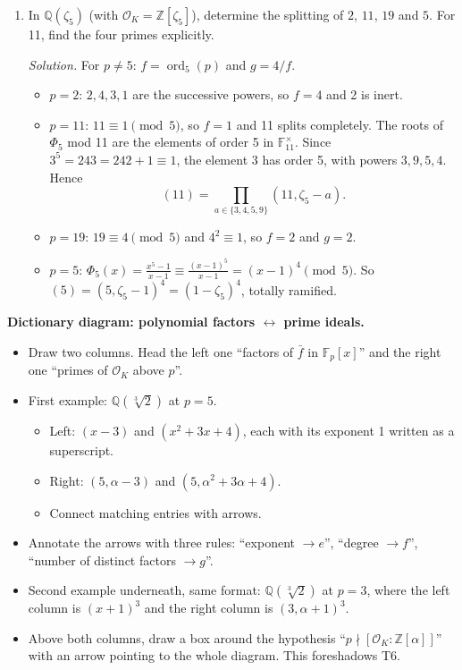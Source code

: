 \documentclass[11pt]{article}
\newcommand{\Z}{\mathbb{Z}}
\newcommand{\Q}{\mathbb{Q}}
\newcommand{\F}{\mathbb{F}}
\newcommand{\OK}{\mathcal{O}_K}
\DeclareMathOperator{\ord}{ord}
\begin{document}
\begin{enumerate}[label=\textbf{Q5.\arabic*}]
  \item In $\Q(\zeta_5)$ (with $\OK=\Z[\zeta_5]$), determine the splitting of $2$, $11$, $19$ and $5$. For 11, find the four primes explicitly.

  \textit{Solution.} For $p\ne5$: $f=\ord_5(p)$ and $g=4/f$.
  \begin{itemize}
    \item $p=2$: $2,4,3,1$ are the successive powers, so $f=4$ and 2 is inert.
    \item $p=11$: $11\equiv1\pmod 5$, so $f=1$ and 11 splits completely. The roots of $\Phi_5$ mod 11 are the elements of order 5 in $\F_{11}^\times$. Since $3^5=243=242+1\equiv1$, the element 3 has order 5, with powers $3,9,5,4$. Hence
    \[
    (11)=\prod_{a\in\{3,4,5,9\}}(11,\zeta_5-a).
    \]
    \item $p=19$: $19\equiv4\pmod 5$ and $4^2\equiv1$, so $f=2$ and $g=2$.
    \item $p=5$: $\Phi_5(x)=\frac{x^5-1}{x-1}\equiv\frac{(x-1)^5}{x-1}=(x-1)^4\pmod5$. So $(5)=(5,\zeta_5-1)^4=(1-\zeta_5)^4$, totally ramified.
  \end{itemize}
\end{enumerate}

\begin{instructornote}
\textbf{Dictionary diagram: polynomial factors $\leftrightarrow$ prime ideals.}
\begin{itemize}
  \item Draw two columns. Head the left one ``factors of $\bar f$ in $\F_p[x]$'' and the right one ``primes of $\OK$ above $p$''.
  \item First example: $\Q(\sqrt[3]2)$ at $p=5$.
  \begin{itemize}
    \item Left: $(x-3)$ and $(x^2+3x+4)$, each with its exponent 1 written as a superscript.
    \item Right: $(5,\alpha-3)$ and $(5,\alpha^2+3\alpha+4)$.
    \item Connect matching entries with arrows.
  \end{itemize}
  \item Annotate the arrows with three rules: ``exponent $\to e$'', ``degree $\to f$'', ``number of distinct factors $\to g$''.
  \item Second example underneath, same format: $\Q(\sqrt[3]2)$ at $p=3$, where the left column is $(x+1)^3$ and the right column is $(3,\alpha+1)^3$.
  \item Above both columns, draw a box around the hypothesis ``$p\nmid[\OK:\Z[\alpha]]$'' with an arrow pointing to the whole diagram. This foreshadows T6.
\end{itemize}
\end{instructornote}
\end{document}
